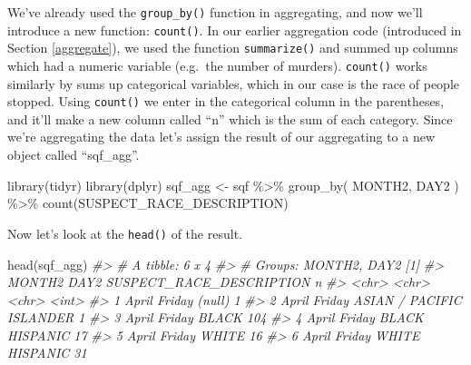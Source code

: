 \documentclass[
]{krantz}
\makeatletter
\newenvironment{Shaded}{\begin{snugshade}}{\end{snugshade}}
\newcommand{\CommentTok}[1]{\textcolor[rgb]{0.37,0.37,0.37}{\textit{#1}}}
\newcommand{\FunctionTok}[1]{\textcolor[rgb]{0,0,0}{#1}}
\newcommand{\NormalTok}[1]{#1}
\newcommand{\OtherTok}[1]{\textcolor[rgb]{0.37,0.37,0.37}{#1}}
\newcommand{\SpecialCharTok}[1]{\textcolor[rgb]{0,0,0}{#1}}
\newenvironment{kframe}{%
\medskip{}
\setlength{\fboxsep}{.8em}
 \def\at@end@of@kframe{}%
 \ifinner\ifhmode%
  \def\at@end@of@kframe{\end{minipage}}%
  \begin{minipage}{\columnwidth}%
 \fi\fi%
 \def\FrameCommand##1{\hskip\@totalleftmargin \hskip-\fboxsep
 \colorbox{shadecolor}{##1}\hskip-\fboxsep
     \hskip-\linewidth \hskip-\@totalleftmargin \hskip\columnwidth}%
 \MakeFramed {\advance\hsize-\width
   \@totalleftmargin\z@ \linewidth\hsize
   \@setminipage}}%
 {\par\unskip\endMakeFramed%
 \at@end@of@kframe}
\renewenvironment{Shaded}{\begin{kframe}}{\end{kframe}}
\makeatother
\begin{document}
We've already used the \texttt{group\_by()} function in
aggregating, and now we'll introduce a new function:
\texttt{count()}. In our earlier aggregation code
(introduced in Section \ref{aggregate}), we used the
function \texttt{summarize()} and summed up columns which
had a numeric variable (e.g.~the number of murders).
\texttt{count()} works similarly by sums up categorical
variables, which in our case is the race of people stopped.
Using \texttt{count()} we enter in the categorical column in
the parentheses, and it'll make a new column called ``n''
which is the sum of each category. Since we're aggregating
the data let's assign the result of our aggregating to a new
object called ``sqf\_agg''.

\begin{Shaded}
\begin{Highlighting}[]
\FunctionTok{library}\NormalTok{(tidyr)}
\FunctionTok{library}\NormalTok{(dplyr)}
\NormalTok{sqf\_agg }\OtherTok{\textless{}{-}}\NormalTok{ sqf }\SpecialCharTok{\%\textgreater{}\%}
  \FunctionTok{group\_by}\NormalTok{(}
\NormalTok{    MONTH2,}
\NormalTok{    DAY2}
\NormalTok{  ) }\SpecialCharTok{\%\textgreater{}\%}
  \FunctionTok{count}\NormalTok{(SUSPECT\_RACE\_DESCRIPTION)}
\end{Highlighting}
\end{Shaded}

Now let's look at the \texttt{head()} of the result.

\begin{Shaded}
\begin{Highlighting}[]
\FunctionTok{head}\NormalTok{(sqf\_agg)}
\CommentTok{\#\textgreater{} \# A tibble: 6 x 4}
\CommentTok{\#\textgreater{} \# Groups:   MONTH2, DAY2 [1]}
\CommentTok{\#\textgreater{}   MONTH2 DAY2   SUSPECT\_RACE\_DESCRIPTION     n}
\CommentTok{\#\textgreater{}   \textless{}chr\textgreater{}  \textless{}chr\textgreater{}  \textless{}chr\textgreater{}                    \textless{}int\textgreater{}}
\CommentTok{\#\textgreater{} 1 April  Friday (null)                       1}
\CommentTok{\#\textgreater{} 2 April  Friday ASIAN / PACIFIC ISLANDER     1}
\CommentTok{\#\textgreater{} 3 April  Friday BLACK                      104}
\CommentTok{\#\textgreater{} 4 April  Friday BLACK HISPANIC              17}
\CommentTok{\#\textgreater{} 5 April  Friday WHITE                       16}
\CommentTok{\#\textgreater{} 6 April  Friday WHITE HISPANIC              31}
\end{Highlighting}
\end{Shaded}
\end{document}
